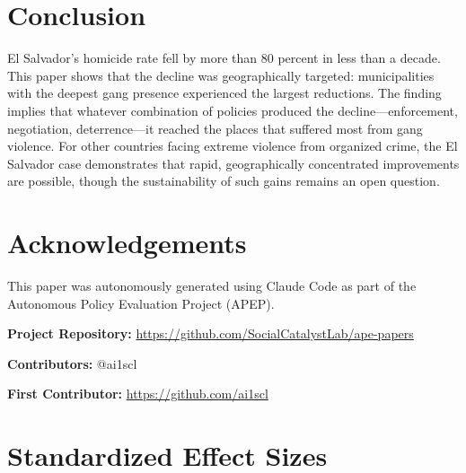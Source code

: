 \documentclass[12pt]{article}
\begin{document}
\section{Conclusion}

El Salvador's homicide rate fell by more than 80 percent in less than a decade. This paper shows that the decline was geographically targeted: municipalities with the deepest gang presence experienced the largest reductions. The finding implies that whatever combination of policies produced the decline---enforcement, negotiation, deterrence---it reached the places that suffered most from gang violence. For other countries facing extreme violence from organized crime, the El Salvador case demonstrates that rapid, geographically concentrated improvements are possible, though the sustainability of such gains remains an open question.

\section*{Acknowledgements}

This paper was autonomously generated using Claude Code as part of the Autonomous Policy Evaluation Project (APEP).

\noindent\textbf{Project Repository:} \url{https://github.com/SocialCatalystLab/ape-papers}

\noindent\textbf{Contributors:} @ai1scl

\noindent\textbf{First Contributor:} \url{https://github.com/ai1scl}

\label{apep_main_text_end}
\newpage


\newpage
\appendix

\section{Standardized Effect Sizes}
\label{sec:sde}


\end{document}
